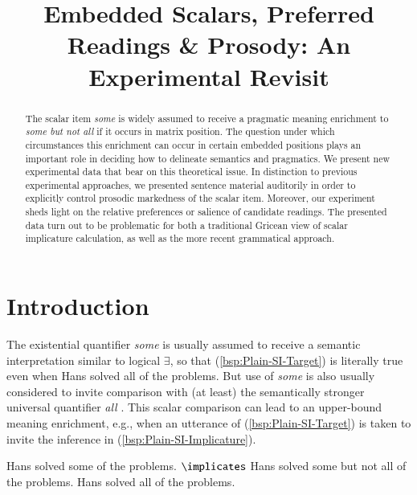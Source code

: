 \documentclass[fleqn,reqno,10pt]{article}
\title{Embedded Scalars, Preferred Readings \& Prosody: {A}n
  Experimental Revisit}
\author{%
}
\date{}
\begin{document}
\maketitle



\begin{abstract}
  The scalar item \emph{some} is widely assumed to receive a pragmatic
  meaning enrichment to \emph{some but not all} if it occurs in matrix
  position. The question under which circumstances this enrichment can
  occur in certain embedded positions plays an important role in
  deciding how to delineate semantics and pragmatics. %
  We present new experimental data that bear on this theoretical
  issue. In distinction to previous experimental approaches, we
  presented sentence material auditorily in order to explicitly
  control prosodic markedness of the scalar item. Moreover, our
  experiment sheds light on the relative preferences or salience of
  candidate readings. The presented data turn out to be problematic
  for both a traditional Gricean view of scalar implicature
  calculation, as well as the more recent grammatical approach.
\end{abstract}




\section{Introduction}
\label{sec:introduction}

The existential quantifier \emph{some} is usually assumed to receive a
semantic interpretation similar to logical $\exists$, so that
(\ref{bsp:Plain-SI-Target}) is literally true even when Hans solved
all of the problems. But use of \emph{some} is also usually considered
to invite comparison with (at least) the semantically stronger
universal quantifier \emph{all}
\citep[c.f.][]{Horn1972:On-the-Semantic,Gazdar1979:Pragmatics:-Imp,AtlasLevinson1981}. This
scalar comparison can lead to an upper-bound meaning enrichment, e.g.,
when an utterance of (\ref{bsp:Plain-SI-Target}) is taken to invite
the inference in (\ref{bsp:Plain-SI-Implicature}).

\begin{exe}
  \ex \label{bsp:Plain-SI}
    \begin{xlist}
      \ex \label{bsp:Plain-SI-Target} Hans solved some of the
        problems.
      \ex \label{bsp:Plain-SI-Implicature} $\implicates$ Hans solved
        some but not all of the problems.
      \ex \label{bsp:Plain-SI-Alternative} Hans solved all of the problems.
    \end{xlist}
\end{exe}
\end{document}

